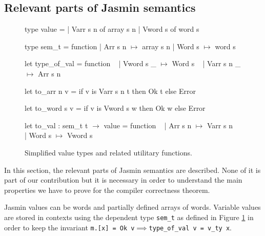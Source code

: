 \documentclass{article}
\begin{document}
\subsection{Relevant parts of Jasmin semantics}

\begin{figure}[t]
\obeylines\obeyspaces\ttfamily%
type value =
| Varr s n of array s n
| Vword s  of word  s

type sem\_t = function
| Arr s n \(\mapsto\) array s n
| Word s  \(\mapsto\) word  s

let type\_of\_val = function
~ | Vword s  \_ \(\mapsto\) Word s
~ | Varr s n \_ \(\mapsto\) Arr s n

let to\_arr  n v = if v is Varr s n t then Ok t else Error

let to\_word s v = if v is Vword s  w then Ok w else Error

let to\_val : sem\_t t \(\to\) value = function
~ | Arr s n \(\mapsto\) Varr s n
~ | Word s  \(\mapsto\) Vword s
\normalfont%
\caption{Simplified value types and related utilitary functions.}\label{fig:oldval}
\end{figure}

In this section, the relevant parts of Jasmin semantics are described. None of
it is part of our contribution but it is necessary in order to understand
the main properties we have to prove for the compiler correctness theorem.

Jasmin values can be words and partially defined arrays of words. Variable
values are stored in contexts using the dependent type \texttt{sem\_t} as
defined in Figure \ref{fig:oldval} in order to keep the invariant
\texttt{m.[x] = Ok v\(\implies\)type\_of\_val v = v\_ty x}.

\medskip
\end{document}
